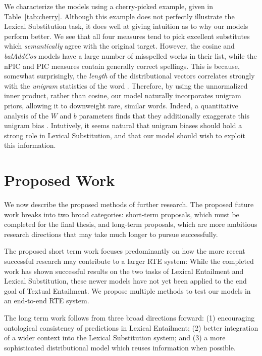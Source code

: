 \documentclass[12pt]{article}
\begin{document}
We characterize the models using a cherry-picked example,
given in Table~\ref{tab:cherry}. Although this example does not perfectly illustrate
the Lexical Substitution task, it does well at giving intuition as to why our
models perform better. We see that all four measures
tend to pick excellent substitutes which {\em semantically} agree with the
original target. However, the cosine and {\em balAddCos} models have a large number of
misspelled works in their list, while the nPIC and PIC measures contain
generally correct spellings. This is because, somewhat surprisingly, the {\em
length} of the distributional vectors correlates strongly with the {\em
unigram} statistics of the word \cite{wilson:2015:arxiv}.
Therefore, by using the unnormalized inner
product, rather than cosine, our model naturally incorporates unigram priors,
allowing it to downweight rare, similar words. Indeed, a quantitative analysis
of the $W$ and $b$ parameters finds that they additionally exaggerate this
unigram bias \cite{roller:2016:naacl}.
Intutively, it seems natural that unigram biases should hold a strong role in
Lexical Substitution, and that our model should wish to exploit this
information.

\pagebreak
\section{Proposed Work}

We now describe the proposed methods of further research. The proposed
future work breaks into two broad categories: short-term proposals,
which must be completed for the final thesis, and long-term proposals, which
are more ambitious research directions that may take much longer to pursue
successfully.

The proposed short term work focuses predominantly on how the more recent
successful research may contribute to a larger RTE system: While the completed
work has shown successful results on the two tasks of Lexical Entailment and
Lexical Substitution, these newer models have not yet been applied to the end
goal of Textual Entailment. We propose multiple methods to test our models
in an end-to-end RTE system.

The long term work follows from three broad directions forward: (1) encouraging
ontological consistency of predictions in Lexical Entailment; (2) better
integration of a wider context into the Lexical Substitution system; and (3) a
more sophisticated distributional model which reuses information when possible.
\end{document}
